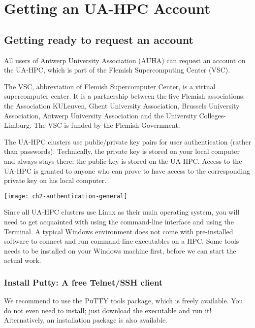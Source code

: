 \chapter{Getting an UA-HPC Account}
\label{ch:getting-a-hpc-account}

\section{Getting ready to request an account}
\label{sec:getting-ready-to-request-an-account}

All users of Antwerp University Association (AUHA) can request an account on
the UA-HPC, which is part of the Flemish Supercomputing Center (VSC).

The VSC, abbreviation of Flemish Supercomputer Center, is a virtual
supercomputer center. It is a partnership between the five Flemish
associations: the Association KULeuven,  Ghent University Association, Brussels
University Association, Antwerp University Association and the University
Colleges-Limburg. The VSC is funded by the Flemish Government.

The UA-HPC clusters use public/private key pairs for user authentication
(rather than passwords). Technically, the private key is stored on your local
computer and always stays there; the public key is stored on the UA-HPC.
Access to the UA-HPC is granted to anyone who can prove to have access to the
corresponding private key on his local computer.

\texttt{[image: ch2-authentication-general]}


  Since all UA-HPC clusters use Linux as their main operating system, you will
  need to get acquainted with using the command-line interface and using the
  Terminal. A typical Windows environment does not come with pre-installed
  software to connect and run command-line executables on a HPC. Some tools
  needs to be installed on your Windows machine first, before we can start the
  actual work.

  \subsection{Install Putty: A free Telnet/SSH client}
  \label{subsec:install-putty}

  We recommend to use the PuTTY tools package, which is freely available. You
  do not even need to install; just download the executable and run it!
  Alternatively, an installation package is also available.

